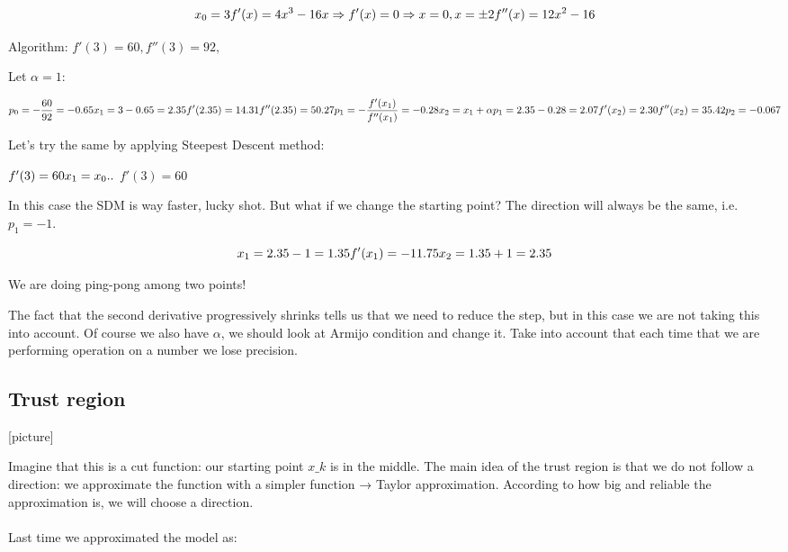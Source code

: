 $$
x_0=3 \\ f'(x) = 4x^3-16x \Rightarrow f'(x)=0 \Rightarrow  x=0, x=\pm 2\\ f''(x)=12x^2-16
$$

Algorithm: $f'(3)=60, f''(3)=92,$

Let $\alpha=1$:

$$
p_0= -\frac{60}{92}=-0.65 \\ x_1=3-0.65=2.35 \\ f'(2.35) = 14.31\\ f''(2.35) = 50.27 \\ p_1=-\frac{f'(x_1)}{f''(x_1)} = -0.28\\ x_2=x_1+\alpha p_1 = 2.35-0.28=2.07 \\ f'(x_2) = 2.30 \\ f''(x_2)=35.42\\ p_2 = -0.067
$$

Let's try the same by applying Steepest Descent method:

$f'(3)=60 \\ x_1 = x_0..$
$f'(3)=60$

In this case the SDM is way faster, lucky shot. But what if we change
the starting point? The direction will always be the same,
i.e.~$p_1 = -1$.

$$
x_1=2.35-1=1.35\\f'(x_1)=-11.75\\x_2=1.35+1 = 2.35 
$$

We are doing ping-pong among two points!

\noindent
The fact that the second derivative progressively shrinks tells us that
we need to reduce the step, but in this case we are not taking this into
account. Of course we also have $\alpha$, we should look at Armijo
condition and change it.
Take into account that each time that we are performing operation on a
number we lose precision.


\subsection{Trust region}

{[}picture{]}

Imagine that this is a cut function: our starting point $x\_k$ is in the
middle. The main idea of the trust region is that we do not follow a
direction: we approximate the function with a simpler function → Taylor
approximation. According to how big and reliable the approximation is,
we will choose a direction.
\\
\\
\noindent
Last time we approximated the model as:

